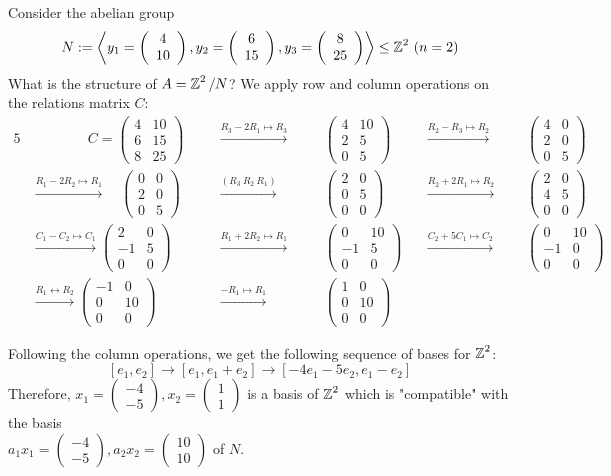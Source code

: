 \documentclass[11pt]{book}
\theoremstyle{definition}   \newtheorem{defn}[counter]{Definition} %
\newcommand{\lra}{\leftrightarrow}   \newcommand{\0}{\mathbf{0}}   \newcommand{\mc}[1]{\mathcal{#1}}   \newcommand{\hra}{\hookrightarrow}   \newcommand{\hla}{\hookleftarrow}
\newcommand{\mymatrix}[2]{\left( \begin{array}{#1} #2 \end{array} \right)}
\newcommand{\gen}[1]{\left\langle #1 \right\rangle}   \newcommand{\stab}[2]{\tn{Stab}_{#1}(#2)}   \newcommand{\fix}[2]{\tn{Fix}_{#1}(#2)}   \newcommand{\op}{^{\tn{op}}}
\numberwithin{counter}{chapter}
\begin{document}
\begin{example}
Consider the abelian group
	\[N := \gen{y_1 = \mymatrix{c}{4 \\ 10}, y_2 = \mymatrix{c}{6 \\ 15}, y_3 = \mymatrix{c}{8 \\ 25}} \leq \z^2 \ (n = 2) \]
What is the structure of $A = \operatorname{\mathbb{Z}}^2/N$? We apply row and column operations on the relations matrix $C$:
\begin{alignat*}{5}
& \qquad \qquad C = \mymatrix{rr}{4 & 10 \\ 6 & 15 \\ 8 & 25} \quad && \overset{R_3 - 2R_1 \mapsto R_3}{\longrightarrow} \quad && \mymatrix{rr}{4 & 10 \\ 2 & 5 \\ 0 & 5} \quad && \overset{R_2 - R_3 \mapsto R_2}{\longrightarrow} \quad && \mymatrix{rr}{4 & 0 \\ 2 & 0 \\ 0 & 5} \\
& \overset{R_1 - 2R_2 \mapsto R_1}{\longrightarrow} \quad \mymatrix{rr}{0 & 0 \\ 2 & 0 \\ 0 & 5} && \overset{(R_3 \ R_2 \ R_1)}{\longrightarrow} && \mymatrix{rr}{2 & 0 \\ 0 & 5 \\ 0 & 0} && \overset{R_2 + 2 R_1 \mapsto R_2}{\longrightarrow} && \mymatrix{cc}{2 & 0 \\ 4 & 5 \\ 0 & 0} \\
& \overset{C_1 - C_2 \mapsto C_1}{\longrightarrow} \mymatrix{cc}{2 & 0 \\ -1 & 5 \\ 0 & 0} && \overset{R_1 + 2R_2 \mapsto R_1}{\longrightarrow} && \mymatrix{rr}{0 & 10 \\ -1 & 5 \\ 0 & 0} && \overset{C_2 + 5 C_1 \mapsto C_2}{\longrightarrow} && \mymatrix{rr}{0 & 10 \\ -1 & 0 \\ 0 & 0} \\
& \overset{R_1 \lra R_2}{\longrightarrow} \mymatrix{rr}{-1 & 0 \\ 0 & 10 \\ 0 & 0} && \overset{-R_1 \mapsto R_1}{\longrightarrow} && \mymatrix{rr}{1 & 0 \\ 0 & 10 \\ 0 & 0} 
\end{alignat*}

Following the column operations, we get the following sequence of bases for $\operatorname{\mathbb{Z}}^2$:
	\[[e_1,e_2] \longrightarrow [e_1,e_1 + e_2] \longrightarrow [-4e_1 - 5e_2, e_1 - e_2] \]
Therefore, $x_1 = \mymatrix{r}{-4 \\ -5}, x_2 = \mymatrix{r}{1 \\ 1}$ is a basis of $\operatorname{\mathbb{Z}}^2$ which is "compatible" with the basis \\ $a_1 x_1 = \mymatrix{r}{-4 \\ -5}, a_2 x_2 = \mymatrix{r}{10 \\ 10}$ of $N$. 
\end{example}
\end{document}
